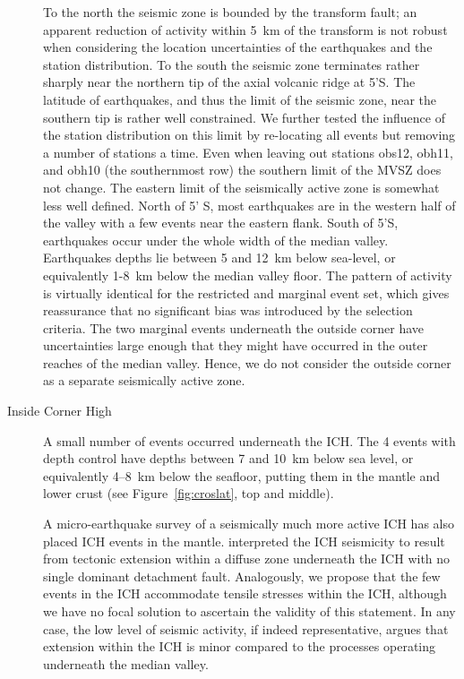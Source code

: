 \documentclass[jgr]{agu2001}
\newlength{\tw}
\begin{document}
\begin{article}
\begin{description}
  To the north the seismic zone is
bounded by the transform fault; an apparent reduction of activity
within 5~km of the transform is not robust when considering the
location uncertainties of the earthquakes and the station
distribution. To the south the seismic zone terminates rather sharply near the
northern tip of the axial volcanic ridge at 5'S.  The latitude
of earthquakes, and thus the limit of the seismic zone,
 near the southern tip is rather well constrained.  We
further tested the influence of the station distribution on this limit
by re-locating all events but removing a number of stations a time.
Even when leaving out stations obs12, obh11, and obh10 (the
southernmost row) the southern limit of the MVSZ
does not change.  The eastern limit of the seismically active zone is
somewhat less well defined.  North of 5' S, most earthquakes are
in the western half of the valley with a few events near the eastern
flank.  South of  5'S, earthquakes occur under the whole
width of the median valley. Earthquakes depths lie between 5 and 12~km
below sea-level, or equivalently 1-8~km below the median valley floor.  The pattern
of activity is virtually identical for the restricted and marginal
event set, which gives reassurance that no significant bias was
introduced by the selection criteria.
  The two marginal events
underneath the outside corner have uncertainties large enough that
they might have occurred in the outer reaches of the median valley. Hence, we
do not consider the outside corner as a separate seismically
active zone.

\item[Inside Corner High]  A small number of events occurred
underneath the ICH.  The  4 events with depth control have depths
between 7 and 10~km below sea level, or equivalently 4--8~km
below the seafloor, putting them in the mantle and lower
crust (see Figure~\ref{fig:croslat}, top and middle). 

A micro-earthquake survey of a  seismically much more active ICH
\citep[at 29\dg N,][]{wolfe95} has also placed ICH events in the
mantle.
\citet{wolfe95} interpreted the ICH
seismicity to result from tectonic extension within a
diffuse zone underneath the ICH with no single dominant detachment
fault.  Analogously, we propose that the few events in the ICH
accommodate tensile stresses within the ICH, although we have no focal solution to
ascertain the validity of this statement.  In any case, the low level
of seismic activity, if indeed representative, argues that extension
within the ICH is minor compared to the processes operating underneath the
median valley.


\end{description}
\end{article}
\end{document}
